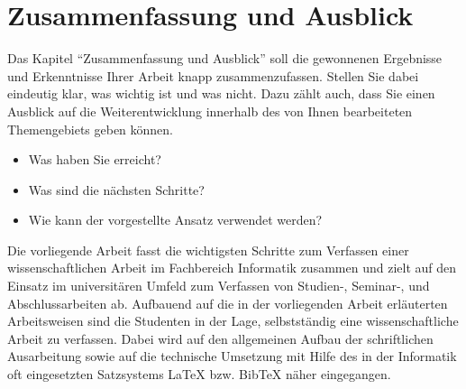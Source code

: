 %
\section{Zusammenfassung und Ausblick}
\label{sec_conclusion}

Das Kapitel "`Zusammenfassung und Ausblick"' soll die gewonnenen Ergebnisse und Erkenntnisse Ihrer Arbeit knapp zusammenzufassen.
Stellen Sie dabei eindeutig klar, was wichtig ist und was nicht.
Dazu zählt auch, dass Sie einen Ausblick auf die Weiterentwicklung innerhalb des von Ihnen bearbeiteten Themengebiets geben können.
\begin{itemize}
\item Was haben Sie erreicht?
\item Was sind die nächsten Schritte?
\item Wie kann der vorgestellte Ansatz verwendet werden?
\end{itemize}

Die vorliegende Arbeit fasst die wichtigsten Schritte zum Verfassen einer wissenschaftlichen Arbeit im Fachbereich Informatik zusammen und zielt auf den Einsatz im universitären Umfeld zum Verfassen von Studien-, Seminar-, und Abschlussarbeiten ab. 
Aufbauend auf die in der vorliegenden Arbeit erläuterten Arbeitsweisen sind die Studenten in der Lage, selbstständig eine wissenschaftliche Arbeit zu verfassen.
Dabei wird auf den allgemeinen Aufbau der schriftlichen Ausarbeitung sowie auf die technische Umsetzung mit Hilfe des in der Informatik oft eingesetzten Satzsystems LaTeX bzw. BibTeX näher eingegangen.  